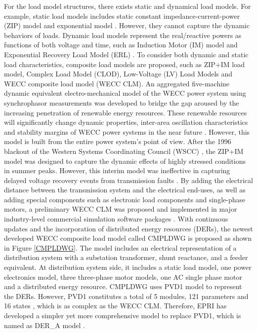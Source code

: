 \documentclass[journal]{IEEEtran}
\begin{document}
	For the load model structures, there exists static and dynamical load models. For example, static load models includes static constant impedance-current-power (ZIP) model and exponential model \cite{Kosterev2008}. However, they cannot capture the dynamic behaviors of loads. Dynamic load models represent the real/reactive powers as functions of both voltage and time, such as Induction Motor (IM) model and Exponential Recovery Load Model (ERL) \cite{Hiskens2001,Arif2018,Huang2019}. To consider both dynamic and static load characteristics, composite load models are proposed, such as ZIP+IM load model, Complex Load Model (CLOD), Low-Voltage (LV) Load Models and WECC composite load model (WECC CLM). An aggregated five-machine dynamic equivalent electro-mechanical model of the WECC power system using synchrophasor measurements was developed to bridge the gap aroused by the increasing penetration of renewable energy resources. These renewable resources will significantly change dynamic properties, inter-area oscillation characteristics and stability margins of WECC power systems in the near future \cite{Chavan2016}. However, this model is built from the entire power system's point of view. After the 1996 blackout of the Western Systems Coordinating Council (WSCC) \cite{Kosterev1999}, the ZIP+IM model was designed to capture the dynamic effects of highly stressed conditions in summer peaks. However, this interim model was ineffective in capturing delayed voltage recovery events from transmission faults \cite{Kosterev2008,Williams1992,Shaffer1997}. By adding the electrical distance between the transmission system and the electrical end-uses, as well as adding special components such as electronic load components and single-phase motors, a preliminary WECC CLM was proposed and implemented in major industry-level commercial  simulation software packages \cite{Arif2018}. With continuous updates and the incorporation of distributed energy resources (DERs), the newest developed WECC composite load model called CMPLDWG is proposed as shown in Figure \ref{CMPLDWG}. The model includes an electrical representation of a distribution system with a substation transformer, shunt reactance, and a feeder equivalent. At distribution system side, it includes a static load model, one power electronics model, three three-phase motor models, one AC single phase motor and a distributed energy resource. CMPLDWG uses PVD1 model to represent the DERs. However, PVD1 constitutes a total of 5 modules, 121 parameters and 16 states , which is as complex as the WECC CLM. Therefore, EPRI has developed a simpler yet more comprehensive model to replace PVD1, which is named as DER\_A model \cite{EPRI2019}.
	
\end{document}
